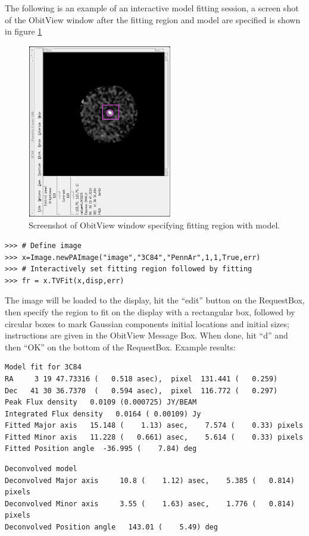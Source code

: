 \documentclass[11pt]{report}
\begin{document}
The following is an example of an interactive model fitting session, a
screen shot of the ObitView window after the fitting region and model
are specified is shown in figure \ref{ImageFitFig}

\begin{figure}
\centering
\includegraphics[angle=-90,origin=c,height=3in]{ImageFit.eps}
\caption{ 
Screenshot of ObitView window specifying fitting region with model.
}
\label{ImageFitFig}
\end{figure}
\begin{verbatim}
>>> # Define image
>>> x=Image.newPAImage("image","3C84","PennAr",1,1,True,err)
>>> # Interactively set fitting region followed by fitting
>>> fr = x.TVFit(x,disp,err)
\end{verbatim}
The image will be loaded to the display, hit the ``edit'' button on
the RequestBox, then specify the region to fit on the display with a
rectangular box, followed by circular boxes to mark Gaussian components
initial locations and initial sizes; instructions are given in the
ObitView Message Box.
When done, hit ``d'' and then ``OK'' on the bottom of the RequestBox.
Example results:
\begin{verbatim}
Model fit for 3C84    
RA     3 19 47.73316 (   0.518 asec),  pixel  131.441 (   0.259)
Dec   41 30 36.7370  (   0.594 asec),  pixel  116.772 (   0.297)
Peak Flux density   0.0109 (0.000725) JY/BEAM 
Integrated Flux density   0.0164 ( 0.00109) Jy
Fitted Major axis   15.148 (    1.13) asec,    7.574 (    0.33) pixels
Fitted Minor axis   11.228 (   0.661) asec,    5.614 (    0.33) pixels
Fitted Position angle  -36.995 (    7.84) deg
\end{verbatim}

\begin{verbatim}
Deconvolved model
Deconvolved Major axis     10.8 (    1.12) asec,    5.385 (   0.814) pixels
Deconvolved Minor axis     3.55 (    1.63) asec,    1.776 (   0.814) pixels
Deconvolved Position angle   143.01 (    5.49) deg
\end{verbatim}
\end{document}
